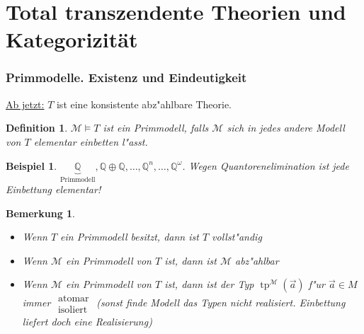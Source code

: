 \documentclass[a4paper,12pt,numbers=noenddot,parskip=full]{scrartcl}
\newcommand{\setQ}{\mathbb{Q}}
\newcommand{\scrM}{\mathcal{M}}
\newcommand{\heading}{\underline}
\DeclareMathOperator{\typ}{tp}
\theoremstyle{dotless}
\newtheorem{definition}[theorem]{Definition}
\newtheorem{example}[theorem]{Beispiel}
\newtheorem{remark}[theorem]{Bemerkung}
\begin{document}
\newpage
\part{Total transzendente Theorien und Kategorizität}
\section{Primmodelle. Existenz und Eindeutigkeit}
\heading{Ab jetzt:} $T$ ist eine konsistente abz"ahlbare Theorie.
\begin{definition}
	$\scrM \models T$ ist ein \emph{Primmodell}, falls $\scrM$ sich in jedes andere Modell von $T$ elementar einbetten l"asst.
\end{definition}
\begin{example}
	$\underbrace{\setQ}_\text{Primmodell} , \setQ \oplus \setQ , \dots, \setQ^n , \dots, \setQ^\omega$. Wegen Quantorenelimination ist jede Einbettung elementar!
\end{example}
\begin{remark}
	\begin{itemize}
		\item Wenn $T$ ein Primmodell besitzt, dann ist $T$ vollst"andig
		\item Wenn $\scrM$ ein Primmodell von $T$ ist, dann ist $\scrM$ abz"ahlbar
		\item Wenn $\scrM$ ein Primmodell von $T$ ist, dann ist der Typ $\typ^\scrM(\vec{a})$ f"ur $\vec{a} \in M$ immer $\begin{array}{c}
			\text{atomar}\\\text{isoliert}
		\end{array}$ (sonst finde Modell das Typen nicht realisiert. Einbettung liefert doch eine Realisierung)
	\end{itemize}
\end{remark}
\end{document}
